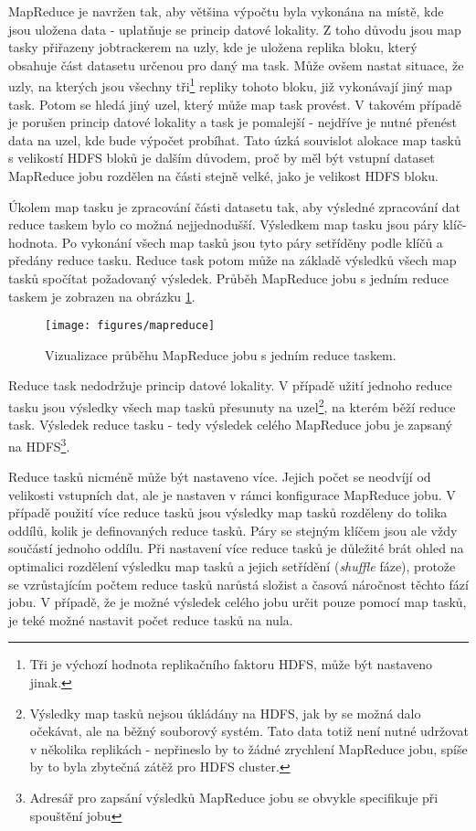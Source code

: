 \documentclass[11pt,twoside,a4paper]{book}
\begin{document}
			MapReduce je navržen tak, aby většina výpočtu byla vykonána na místě, kde jsou uložena data - uplatňuje se princip datové lokality. \cite{mapredc03} Z toho důvodu jsou map tasky přiřazeny jobtrackerem na uzly, kde je uložena replika bloku, který obsahuje část datasetu určenou pro daný ma task. Může ovšem nastat situace, že uzly, na kterých jsou všechny tři\footnote{Tři je výchozí hodnota replikačního faktoru HDFS, může být nastaveno jinak.} repliky tohoto bloku, již vykonávají jiný map task. Potom se hledá jiný uzel, který může map task provést. V takovém případě je porušen princip datové lokality a task je pomalejší - nejdříve je nutné přenést data na uzel, kde bude výpočet probíhat. Tato úzká souvislot alokace map tasků s velikostí HDFS bloků je dalším důvodem, proč by měl být vstupní dataset MapReduce jobu rozdělen na části stejně velké, jako je velikost HDFS bloku.\cite{mapreda01}

			Úkolem map tasku je zpracování části datasetu tak, aby výsledné zpracování dat reduce taskem bylo co možná nejjednodušší. Výsledkem map tasku jsou páry klíč-hodnota. Po vykonání všech map tasků jsou tyto páry setříděny podle klíčů a předány reduce tasku. Reduce task potom může na základě výsledků všech map tasků spočítat požadovaný výsledek. Průběh MapReduce jobu s jedním reduce taskem je zobrazen na obrázku \ref{fig:mapreduce}. 

\begin{figure}
\begin{center}
\label{fig:mapreduce}
\texttt{[image: figures/mapreduce]}
\caption{Vizualizace průběhu MapReduce jobu s jedním reduce taskem.\cite{white01}}
\end{center}
\end{figure}

			Reduce task nedodržuje princip datové lokality. V případě užití jednoho reduce tasku jsou výsledky všech map tasků přesunuty na uzel\footnote{Výsledky map tasků nejsou úkládány na HDFS, jak by se možná dalo očekávat, ale na běžný souborový systém. Tato data totiž není nutné udržovat v několika replikách - nepřineslo by to žádné zrychlení MapReduce jobu, spíše by to byla zbytečná zátěž pro HDFS cluster. }, na kterém běží reduce task. Výsledek reduce tasku - tedy výsledek celého MapReduce jobu je zapsaný na HDFS\footnote{Adresář pro zapsání výsledků MapReduce jobu se obvykle specifikuje při spouštění jobu}.

			Reduce tasků nicméně může být nastaveno více. Jejich počet se neodvíjí od velikosti vstupních dat, ale je nastaven v rámci konfigurace MapReduce jobu. V případě použití více reduce tasků jsou výsledky map tasků rozděleny do tolika oddílů, kolik je definovaných reduce tasků. Páry se stejným klíčem jsou ale vždy součástí jednoho oddílu. Při nastavení více reduce tasků je důležité brát ohled na optimalici rozdělení výsledku map tasků a jejich setřídění (\textit{shuffle} fáze), protože se vzrůstajícím počtem reduce tasků narůstá složist a časová náročnost těchto fází jobu. V případě, že je možné výsledek celého jobu určit pouze pomocí map tasků, je teké možné nastavit počet reduce tasků na nula. \cite{white01}
\end{document}
